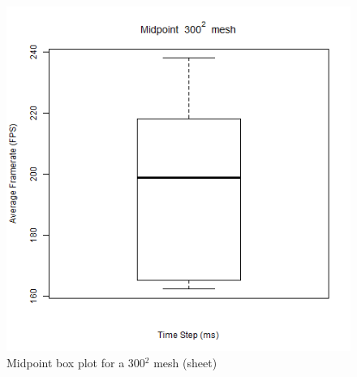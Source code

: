       \begin{figure}
    \begin{center}
      \includegraphics[scale=.9]{Figures/sheet_m_300_box}
    \end{center}
    \caption{Midpoint box plot for a 300$^{2}$ mesh (sheet)}
    \label{fig:m box 300 sheet}
  \end{figure}

